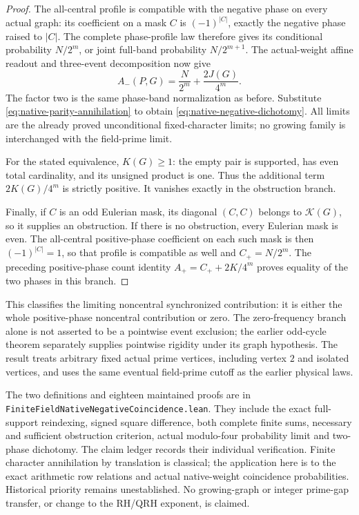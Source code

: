 \documentclass[11pt]{article}
\begin{document}
\begin{proof}
The all-central profile is compatible with the negative phase on
every actual graph: its coefficient on a mask \(C\) is
\((-1)^{|C|}\), exactly the negative phase raised to \(|C|\).
The complete phase-profile law therefore gives its conditional
probability \(N/2^m\), or joint full-band probability \(N/2^{m+1}\).
The actual-weight affine readout and three-event decomposition now
give
\[
                    A_-(P,G)=\frac{N}{2^m}
                                      +\frac{2J(G)}{4^m}.
\]
The factor two is the same phase-band normalization as before.
Substitute \eqref{eq:native-parity-annihilation} to obtain
\eqref{eq:native-negative-dichotomy}. All limits are the already
proved unconditional fixed-character limits; no growing family is
interchanged with the field-prime limit.

For the stated equivalence, \(K(G)\geq1\): the empty pair is supported,
has even total cardinality, and its unsigned product is one.
Thus the additional term \(2K(G)/4^m\) is strictly positive.
It vanishes exactly in the obstruction branch.

Finally, if \(C\) is an odd Eulerian mask, its diagonal \((C,C)\)
belongs to \(\mathcal K(G)\), so it supplies an obstruction.
If there is no obstruction, every Eulerian mask is even.
The all-central positive-phase coefficient on each such mask is
then \((-1)^{|C|}=1\), so that profile is compatible as well and
\(C_+=N/2^m\). The preceding positive-phase count identity
\(A_+=C_++2K/4^m\) proves equality of the two phases in this branch.
\end{proof}

This classifies the limiting noncentral synchronized contribution:
it is either the whole positive-phase noncentral contribution or zero.
The zero-frequency branch alone is not asserted to be a pointwise
event exclusion; the earlier odd-cycle theorem separately supplies
pointwise rigidity under its graph hypothesis.
The result treats arbitrary fixed actual prime vertices, including
vertex \(2\) and isolated vertices, and uses the same eventual
field-prime cutoff as the earlier physical laws.

The two definitions and eighteen maintained proofs are in
\texttt{FiniteFieldNativeNegativeCoincidence.lean}.
They include the exact full-support reindexing, signed square
difference, both complete finite sums, necessary and sufficient
obstruction criterion, actual modulo-four probability limit and
two-phase dichotomy. The claim ledger records their individual
verification. Finite character annihilation by translation is classical;
the application here is to the exact arithmetic row relations and
actual native-weight coincidence probabilities. Historical priority
remains unestablished. No growing-graph or integer prime-gap transfer,
or change to the RH/QRH exponent, is claimed.
\end{document}
